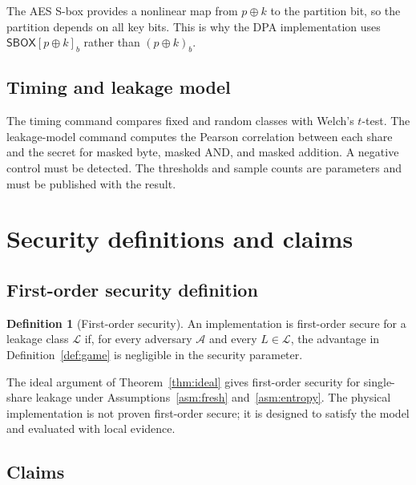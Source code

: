 \documentclass[11pt,a4paper]{article}
\newcommand{\Sbox}{\mathsf{SBOX}}
\newcommand{\Adv}{\mathcal{A}}
\theoremstyle{plain}
\theoremstyle{definition}
\newtheorem{definition}[theorem]{Definition}
\theoremstyle{remark}
\begin{document}
The AES S-box provides a nonlinear map from \(p\oplus k\) to the partition bit, so the
partition depends on all key bits. This is why the DPA implementation uses
\(\Sbox[p\oplus k]_b\) rather than \((p\oplus k)_b\).

\subsection{Timing and leakage model}

The timing command compares fixed and random classes with Welch's \(t\)-test. The
leakage-model command computes the Pearson correlation between each share and the
secret for masked byte, masked AND, and masked addition. A negative control must be
detected. The thresholds and sample counts are parameters and must be published with
the result.

\section{Security definitions and claims}\label{sec:claims}

\subsection{First-order security definition}

\begin{definition}[First-order security]\label{def:fo-secure}
An implementation is first-order secure for a leakage class \(\mathcal{L}\) if, for
every adversary \(\Adv\) and every \(L\in\mathcal{L}\), the advantage in
Definition~\ref{def:game} is negligible in the security parameter.
\end{definition}

The ideal argument of Theorem~\ref{thm:ideal} gives first-order security for
single-share leakage under Assumptions~\ref{asm:fresh} and~\ref{asm:entropy}. The
physical implementation is not proven first-order secure; it is designed to satisfy the
model and evaluated with local evidence.

\subsection{Claims}
\end{document}
